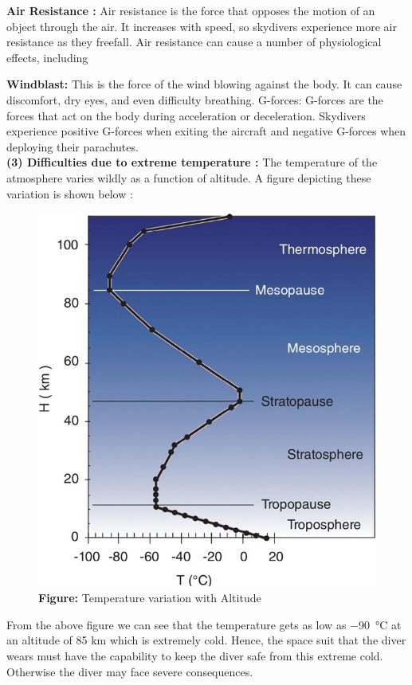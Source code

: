 \documentclass[a4paper, 14pt]{extarticle}
\begin{document}
\textbf{Air Resistance :}
Air resistance is the force that opposes the motion of an object through the air. It increases with speed, so skydivers experience more air resistance as they freefall. Air resistance can cause a number of physiological effects, including

\textbf{Windblast:} This is the force of the wind blowing against the body. It can cause discomfort, dry eyes, and even difficulty breathing.
G-forces: G-forces are the forces that act on the body during acceleration or deceleration. Skydivers experience positive G-forces when exiting the aircraft and negative G-forces when deploying their parachutes.\\
\textbf{(3) Difficulties due to extreme temperature :} The temperature of the atmosphere varies wildly as a function of altitude. A figure depicting these variation is shown below :
\begin{figure}[H]
\centering
\includegraphics[width=0.6\linewidth]{temp.jpeg}
\caption*{\textbf{Figure:} Temperature variation with Altitude}
\end{figure}
From the above figure we can see that the temperature gets as low as \SI{-90}{\degreeCelsius} at an altitude of 85 km which is extremely cold. Hence, the space suit that the diver wears must have the capability to keep the diver safe from this extreme cold. Otherwise the diver may face severe consequences\citep{baldwin2019progress}.\\ \\
\end{document}
